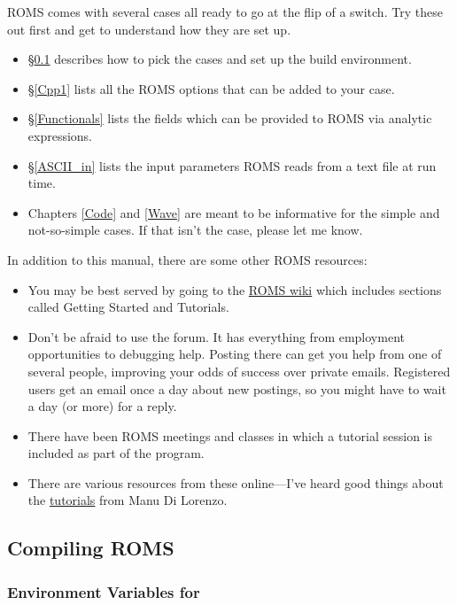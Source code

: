 ROMS comes with several cases all ready to go at the flip
of a switch. Try these out first and get to understand how they
are set up.
    \begin{itemize}
      \item \S\ref{Build} describes how to pick the cases and set up
      the build environment.
      \item \S\ref{Cpp1} lists all the ROMS options that can be
      added to your case.
      \item \S\ref{Functionals} lists the fields which can be
      provided to ROMS via analytic expressions.
      \item \S\ref{ASCII_in} lists the input parameters ROMS reads
      from a text file at run time.
      \item Chapters \ref{Code} and \ref{Wave} are meant to be
      informative for the simple and not-so-simple cases. If that
      isn't the case, please let me know.
    \end{itemize}
In addition to this manual, there are some other ROMS resources:
\begin{itemize}
   \item You may be best served by going to the 
\href{https://www.myroms.org/wiki/}{ROMS wiki} which includes
sections called Getting Started and Tutorials.
   \item Don't be afraid to use the forum. It has everything from
employment opportunities to debugging help. Posting there can get
you help from one of several people, improving your odds of success
over private emails. Registered users get an email once a day about
new postings, so you might have to wait a day (or more) for a reply.
   \item There have been ROMS meetings and classes in which a tutorial
session is included as part of the program.
   \item There are various resources
from these online---I've heard good things about the
\href{http://eros.eas.gatech.edu/ROMS-Tutorial/tutorials.html}{tutorials}
from Manu Di Lorenzo.
\end{itemize}

\subsection{Compiling ROMS}
\label{Build}

\subsubsection{Environment Variables for }
\label{make_var}

